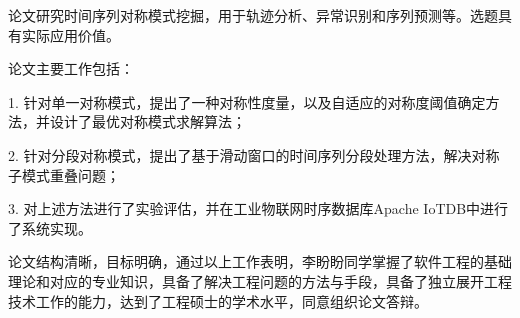 
\begin{comments}

论文研究时间序列对称模式挖掘，用于轨迹分析、异常识别和序列预测等。选题具有实际应用价值。 
  
论文主要工作包括：  
 
1. 针对单一对称模式，提出了一种对称性度量，以及自适应的对称度阈值确定方法，并设计了最优对称模式求解算法； 
 
2. 针对分段对称模式，提出了基于滑动窗口的时间序列分段处理方法，解决对称子模式重叠问题； 
 
3. 对上述方法进行了实验评估，并在工业物联网时序数据库Apache IoTDB中进行了系统实现。 
 
论文结构清晰，目标明确，通过以上工作表明，李盼盼同学掌握了软件工程的基础理论和对应的专业知识，具备了解决工程问题的方法与手段，具备了独立展开工程技术工作的能力，达到了工程硕士的学术水平，同意组织论文答辩。

\end{comments}
